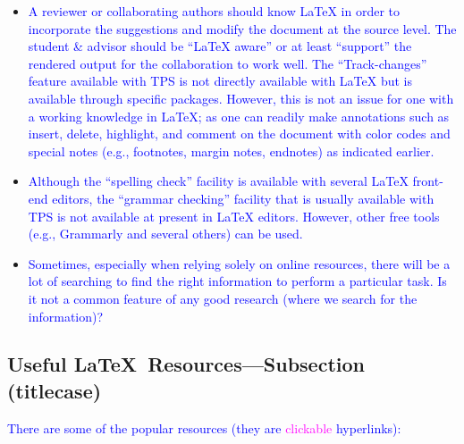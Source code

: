 \documentclass[phd]{ndsu-thesis-2022}
\newcommand\italk[1]{\textcolor{blue}{#1}}  %
\newcommand\lx{\LaTeX\xspace}
\begin{document}
\begin{itemize}[leftmargin=*, itemsep=0pt, parsep=3pt]
\item \italk{A reviewer or collaborating authors should know \lx in order to incorporate the suggestions and modify the document at the source level. The student \& advisor should be ``\lx aware'' or at least ``support'' the rendered output for the collaboration to work well.  The ``Track-changes'' feature available with TPS is not directly available with \lx but is available through specific packages. However, this is not an issue for one with a working knowledge in \lx; as one can readily make annotations such as insert, delete, highlight, and comment on the document with color codes and special notes (e.g., footnotes, margin notes, endnotes) as indicated earlier.} 

\item \italk{Although the ``spelling check'' facility is available with several \lx front-end editors, the ``grammar checking'' facility that is usually available with TPS is not available at present in \lx editors. However, other free tools (e.g., Grammarly and several others) can be used.}  

\item \italk{Sometimes, especially when relying solely on online resources, there will be a lot of searching to find the right information to perform a particular task. Is it not a common feature of any good research (where we search for the information)?} 

\end{itemize}

\subsection{Useful \LaTeX\ Resources---Subsection (titlecase)} 

\italk{There are some of the popular resources (they are \textcolor{magenta}{clickable} hyperlinks):}
\end{document}
